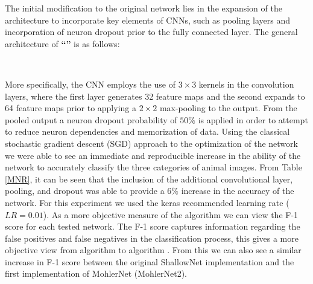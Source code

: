 \documentclass[12pt]{article}
\begin{document}
The initial modification to the original network lies in the expansion of the architecture to incorporate key elements of CNNs, such as pooling layers and incorporation of neuron dropout prior to the fully connected layer. The general architecture of \textbf{``''} is as follows: 
\begin{center}
	 \\
\end{center}
More specifically, the CNN employs the use of $3\times3$ kernels in the convolution layers, where the first layer generates 32 feature maps and the second expands to 64 feature maps prior to applying a $2\times2$ max-pooling to the output. From the pooled output a neuron dropout probability of $50\%$ is applied in order to attempt to reduce neuron dependencies and memorization of data. Using the classical stochastic gradient descent (SGD) approach to the optimization of the network we were able to see an immediate and reproducible increase in the ability of the network to accurately classify the three categories of animal images.  From Table \ref{MNR}, it can be seen that the inclusion of the additional convolutional layer, pooling, and dropout was able to provide a $6\%$ increase in the accuracy of the network. For this experiment we used the keras recommended learning rate ($LR = 0.01$). As a more objective measure of the algorithm we can view the F-1 score for each tested network. The F-1 score captures information regarding the false positives and false negatives in the classification process, this gives a more objective view from algorithm to algorithm . From this we can also see a similar increase in F-1 score between the original ShallowNet implementation and the first implementation of MohlerNet (MohlerNet2). 
\end{document}

